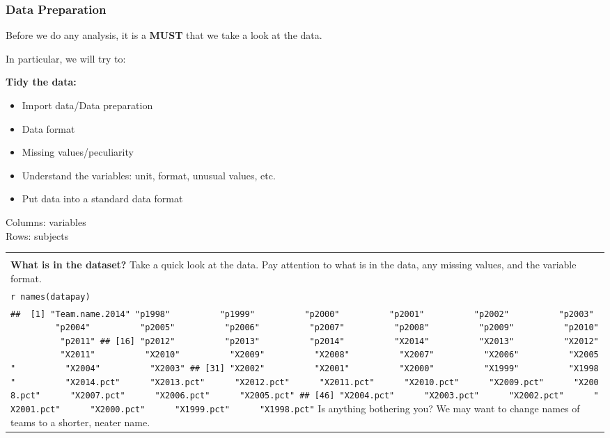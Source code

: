 \documentclass[
]{article}
\providecommand{\tightlist}{%
  \setlength{\itemsep}{0pt}\setlength{\parskip}{0pt}}
\begin{document}
\frametitle{Data Preparation}

\begin{alertblock}{}
Before we do any analysis, it is a \textbf{MUST} that we take a look at the data.
\end{alertblock}

In particular, we will try to:

\textbf{Tidy the data:}

\begin{itemize}
\tightlist
\item
  Import data/Data preparation
\item
  Data format
\item
  Missing values/peculiarity
\item
  Understand the variables: unit, format, unusual values, etc.
\item
  Put data into a standard data format
\end{itemize}

Columns: variables\\
Rows: subjects

\begin{longtable}[]{@{}
  >{\raggedright\arraybackslash}p{}@{}}
\toprule
\endhead
 \\
\textbf{What is in the dataset?} Take a quick look at the data. Pay
attention to what is in the data, any missing values, and the variable
format. \tiny \\
\texttt{r\ names(datapay)} \\
\texttt{\#\#\ \ {[}1{]}\ "Team.name.2014"\ "p1998"\ \ \ \ \ \ \ \ \ \ "p1999"\ \ \ \ \ \ \ \ \ \ "p2000"\ \ \ \ \ \ \ \ \ \ "p2001"\ \ \ \ \ \ \ \ \ \ "p2002"\ \ \ \ \ \ \ \ \ \ "p2003"\ \ \ \ \ \ \ \ \ \ "p2004"\ \ \ \ \ \ \ \ \ \ "p2005"\ \ \ \ \ \ \ \ \ \ "p2006"\ \ \ \ \ \ \ \ \ \ "p2007"\ \ \ \ \ \ \ \ \ \ "p2008"\ \ \ \ \ \ \ \ \ \ "p2009"\ \ \ \ \ \ \ \ \ \ "p2010"\ \ \ \ \ \ \ \ \ \ "p2011"\ \#\#\ {[}16{]}\ "p2012"\ \ \ \ \ \ \ \ \ \ "p2013"\ \ \ \ \ \ \ \ \ \ "p2014"\ \ \ \ \ \ \ \ \ \ "X2014"\ \ \ \ \ \ \ \ \ \ "X2013"\ \ \ \ \ \ \ \ \ \ "X2012"\ \ \ \ \ \ \ \ \ \ "X2011"\ \ \ \ \ \ \ \ \ \ "X2010"\ \ \ \ \ \ \ \ \ \ "X2009"\ \ \ \ \ \ \ \ \ \ "X2008"\ \ \ \ \ \ \ \ \ \ "X2007"\ \ \ \ \ \ \ \ \ \ "X2006"\ \ \ \ \ \ \ \ \ \ "X2005"\ \ \ \ \ \ \ \ \ \ "X2004"\ \ \ \ \ \ \ \ \ \ "X2003"\ \#\#\ {[}31{]}\ "X2002"\ \ \ \ \ \ \ \ \ \ "X2001"\ \ \ \ \ \ \ \ \ \ "X2000"\ \ \ \ \ \ \ \ \ \ "X1999"\ \ \ \ \ \ \ \ \ \ "X1998"\ \ \ \ \ \ \ \ \ \ "X2014.pct"\ \ \ \ \ \ "X2013.pct"\ \ \ \ \ \ "X2012.pct"\ \ \ \ \ \ "X2011.pct"\ \ \ \ \ \ "X2010.pct"\ \ \ \ \ \ "X2009.pct"\ \ \ \ \ \ "X2008.pct"\ \ \ \ \ \ "X2007.pct"\ \ \ \ \ \ "X2006.pct"\ \ \ \ \ \ "X2005.pct"\ \#\#\ {[}46{]}\ "X2004.pct"\ \ \ \ \ \ "X2003.pct"\ \ \ \ \ \ "X2002.pct"\ \ \ \ \ \ "X2001.pct"\ \ \ \ \ \ "X2000.pct"\ \ \ \ \ \ "X1999.pct"\ \ \ \ \ \ "X1998.pct"}
\normalsize Is anything bothering you? We may want to change names of
teams to a shorter, neater name. \\
\bottomrule
\end{longtable}
\end{document}
